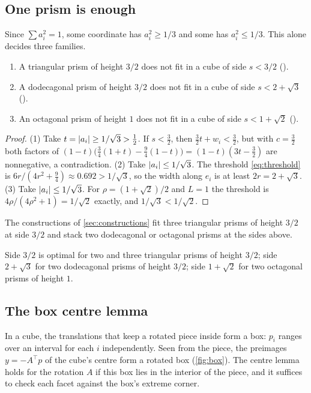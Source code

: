 \documentclass[11pt,a4paper]{article}
\begin{document}
\subsection{One prism is enough}\label{sec:onepiece}
Since $\sum a_i^2=1$, some coordinate has $a_i^2\ge1/3$ and some has $a_i^2\le1/3$. This alone decides three families.

\begin{proposition}\label{prop:onepiece}
\begin{enumerate}
\item A triangular prism of height $3/2$ does not fit in a cube of side $s<3/2$ ().
\item A dodecagonal prism of height $3/2$ does not fit in a cube of side $s<2+\sqrt3$ ().
\item An octagonal prism of height $1$ does not fit in a cube of side $s<1+\sqrt2$ ().
\end{enumerate}
\end{proposition}
\begin{proof}
(1) Take $t=\lvert a_i\rvert\ge1/\sqrt3>\tfrac12$. If $s<\tfrac32$, then $\tfrac32t+w_i<\tfrac32$, but with $c=\tfrac32$ both factors of $(1-t)\bigl(\tfrac34(1+t)-\tfrac94(1-t)\bigr)=(1-t)(3t-\tfrac32)$ are nonnegative, a contradiction.
(2) Take $\lvert a_i\rvert\le1/\sqrt3$. The threshold \eqref{eq:threshold} is $6r/(4r^2+\tfrac94)\approx0.692>1/\sqrt3$, so the width along $e_i$ is at least $2r=2+\sqrt3$.
(3) Take $\lvert a_i\rvert\le1/\sqrt3$. For $\rho=(1+\sqrt2)/2$ and $L=1$ the threshold is $4\rho/(4\rho^2+1)=1/\sqrt2$ exactly, and $1/\sqrt3<1/\sqrt2$.
\end{proof}

The constructions of \cref{sec:constructions} fit three triangular prisms of height $3/2$ at side $3/2$ and stack two dodecagonal or octagonal prisms at the sides above.

\begin{theorem}
Side $3/2$ is optimal for two and three triangular prisms of height $3/2$; side $2+\sqrt3$ for two dodecagonal prisms of height $3/2$; side $1+\sqrt2$ for two octagonal prisms of height $1$.
\end{theorem}

\subsection{The box centre lemma}\label{sec:box}
In a cube, the translations that keep a rotated piece inside form a box: $p_i$ ranges over an interval for each $i$ independently. Seen from the piece, the preimages $y=-A^\top p$ of the cube's centre form a rotated box (\cref{fig:box}). The centre lemma holds for the rotation $A$ if this box lies in the interior of the piece, and it suffices to check each facet against the box's extreme corner.
\end{document}
